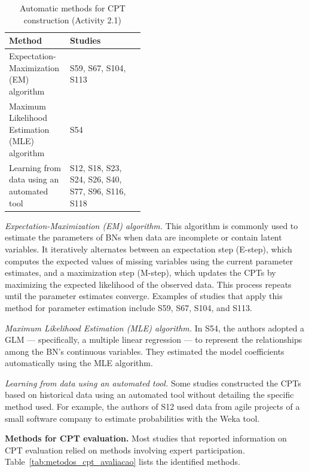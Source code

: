 \begin{table}[t]
\caption{Automatic methods for CPT construction (Activity 2.1)}
\label{tab:metodos_auto_cpt}
\centering
\small
\setlength{\tabcolsep}{6pt}
\renewcommand{\arraystretch}{1.2}

\begin{tabularx}{0.70\linewidth}{>{\raggedright\arraybackslash}p{0.45\linewidth}
                              >{\raggedright\arraybackslash}X}
\toprule
\textbf{Method} & \textbf{Studies} \\
\midrule
Expectation-Maximization (EM) algorithm
& S59, S67, S104, S113 \\
Maximum Likelihood Estimation (MLE) algorithm
& S54 \\
Learning from data using an automated tool
& S12, S18, S23, S24, S26, S40, S77, S96, S116, S118 \\
\bottomrule
\end{tabularx}
\end{table}

\textit{Expectation-Maximization (EM) algorithm.} This algorithm is commonly used to estimate the parameters of BNs when data are incomplete or contain latent variables. It iteratively alternates between an expectation step (E-step), which computes the expected values of missing variables using the current parameter estimates, and a maximization step (M-step), which updates the CPTs by maximizing the expected likelihood of the observed data. This process repeats until the parameter estimates converge. Examples of studies that apply this method for parameter estimation include S59, S67, S104, and S113.

\textit{Maximum Likelihood Estimation (MLE) algorithm.} In S54, the authors adopted a GLM --- specifically, a multiple linear regression --- to represent the relationships among the BN's continuous variables. They estimated the model coefficients automatically using the MLE algorithm.

\textit{Learning from data using an automated tool.} Some studies constructed the CPTs based on historical data using an automated tool without detailing the specific method used. For example, the authors of S12 used data from agile projects of a small software company to estimate probabilities with the Weka tool.

\vspace*{0.5\baselineskip}
\textbf{Methods for CPT evaluation.} Most studies that reported information on CPT evaluation relied on methods involving expert participation. Table~\ref{tab:metodos_cpt_avaliacao} lists the identified methods.

